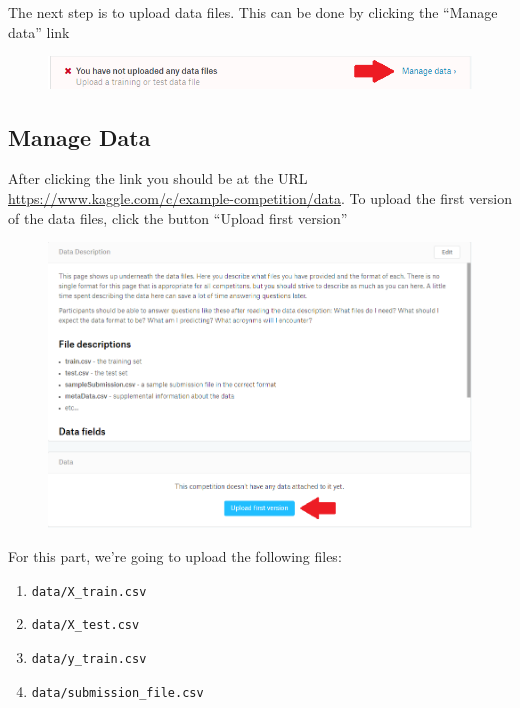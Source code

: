 \documentclass{article}
\begin{document}
The next step is to upload data files. This can be done by clicking the
``Manage data'' link

\begin{figure}[H]
    \centering
    \includegraphics[width=\linewidth]{figures/manage-data.PNG}
\end{figure}

\subsection{Manage Data}\label{manage-data}

After clicking the link you should be at the URL
\url{https://www.kaggle.com/c/example-competition/data}. To upload the
first version of the data files, click the button ``Upload first
version''

\begin{figure}[H]
    \centering
    \includegraphics[width=\linewidth]{figures/upload-data.PNG}
\end{figure}

For this part, we're going to upload the following files:

\begin{enumerate}
\item
  \texttt{data/X\_train.csv}
\item
  \texttt{data/X\_test.csv}
\item
  \texttt{data/y\_train.csv}
\item
  \texttt{data/submission\_file.csv}
\end{enumerate}
\end{document}
